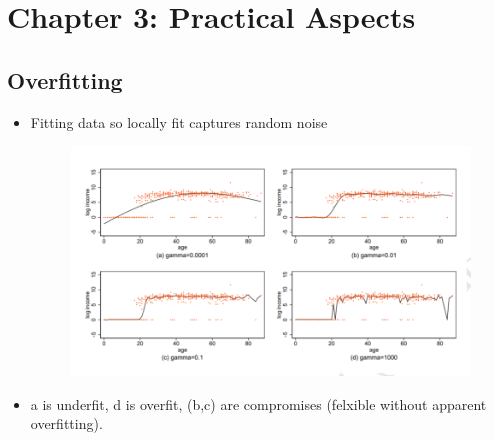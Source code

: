 \documentclass[12pt, oneside]{article}
\begin{document}
\newpage

\section{Chapter 3: Practical Aspects}
\subsection{Overfitting}
\begin{itemize}
    \item Fitting data so locally fit captures random noise
    \begin{figure}[ht]
    \centering
    \includegraphics[width=\textwidth]{Fit of SVM.png}       
    \label{fig:my_label}
\end{figure}
\item a is underfit, d is overfit, (b,c) are compromises (felxible without apparent overfitting).
\end{itemize}
\end{document}
